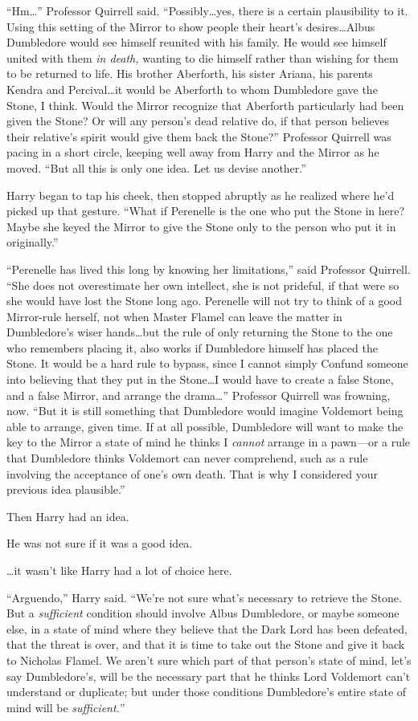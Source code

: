 “Hm…” Professor Quirrell said. “Possibly…yes, there is a certain
plausibility to it. Using this setting of the Mirror to show people their
heart’s desires…Albus Dumbledore would see himself reunited with his
family. He would see himself united with them \emph{in death,} wanting to die
himself rather than wishing for them to be returned to life. His brother
Aberforth, his sister Ariana, his parents Kendra and Percival…it would
be Aberforth to whom Dumbledore gave the Stone, I think. Would the Mirror
recognize that Aberforth particularly had been given the Stone? Or will any
person’s dead relative do, if that person believes their relative’s spirit
would give them back the Stone?” Professor Quirrell was pacing in a short
circle, keeping well away from Harry and the Mirror as he moved. “But all this
is only one idea. Let us devise another.”

Harry began to tap his cheek, then stopped abruptly as he realized where he’d
picked up that gesture. “What if Perenelle is the one who put the Stone in
here? Maybe she keyed the Mirror to give the Stone only to the person who put
it in originally.”

“Perenelle has lived this long by knowing her limitations,” said Professor
Quirrell. “She does not overestimate her own intellect, she is not prideful, if
that were so she would have lost the Stone long ago. Perenelle will not try to
think of a good Mirror-rule herself, not when Master Flamel can leave the
matter in Dumbledore’s wiser hands…but the rule of only returning the
Stone to the one who remembers placing it, also works if Dumbledore himself has
placed the Stone. It would be a hard rule to bypass, since I cannot simply
Confund someone into believing that they put in the Stone…I would have
to create a false Stone, and a false Mirror, and arrange the drama…”
Professor Quirrell was frowning, now. “But it is still something that
Dumbledore would imagine Voldemort being able to arrange, given time. If at all
possible, Dumbledore will want to make the key to the Mirror a state of mind he
thinks I \emph{cannot} arrange in a pawn—or a rule that Dumbledore thinks
Voldemort can never comprehend, such as a rule involving the acceptance of
one’s own death. That is why I considered your previous idea plausible.”

Then Harry had an idea.

He was not sure if it was a good idea.

…it wasn’t like Harry had a lot of choice here.

“Arguendo,” Harry said. “We’re not sure what’s necessary to retrieve the Stone.
But a \emph{sufficient} condition should involve Albus Dumbledore, or maybe
someone else, in a state of mind where they believe that the Dark Lord has been
defeated, that the threat is over, and that it is time to take out the Stone
and give it back to Nicholas Flamel. We aren’t sure which part of that person’s
state of mind, let’s say Dumbledore’s, will be the necessary part that he
thinks Lord Voldemort can’t understand or duplicate; but under those conditions
Dumbledore’s entire state of mind will be \emph{sufficient.}”


